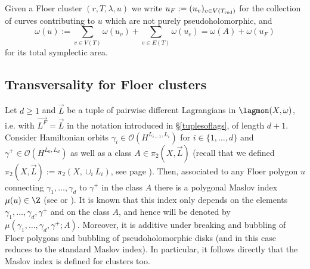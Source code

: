 Given a Floer cluster $(r,T,\lambda,u)$ we write $u_F:=(u_v)_{v\in V(T_\textnormal{red})}$ for the collection of curves contributing to $u$ which are not purely pseudoholomorphic, and $$\omega(u):=\sum_{v\in V(T)}\omega(u_v)+\sum_{e\in E(T)}\omega(u_e)= \omega(A)+\omega(u_F)$$ for its total symplectic area.\label{uf}


\subsection{Transversality for Floer clusters}\label{transversality for floer clusters} %

Let $d\geq 1$ and $\vec{L}$ be a tuple of pairwise different Lagrangians in $\lagmon(X,\omega)$, i.e. with $\vec{L^F}=\vec{L}$ in the notation introduced in \S \ref{tuplesoflags}, of length $d+1$. Consider Hamiltonian orbits $\gamma_i\in \mathcal{O}(H^{L_{i-1},L_i})$ for $i\in \{1,\ldots, d\}$ and $\gamma^+\in \mathcal{O}(H^{L_0,L_d})$ as well as a class $A\in \pi_2(X,\vec{L})$ (recall that we defined $\pi_2(X,\vec{L}):=\pi_2(X,\cup_iL_i)$, see page \pageref{piconvention}). Then, associated to any Floer polygon $u$ connecting $\gamma_1,\ldots, \gamma_d$ to $\gamma^+$ in the class $A$ there is a polygonal Maslov index $\mu(u)\in \Z$ (see \cite{FO3:book-vol1} or \cite[Chapter 13]{Oh2015SymplecticHomology}). It is known that this index only depends on the elements $\gamma_1,\ldots, \gamma_d,\gamma^+$ and on the class $A$, and hence will be denoted by $\mu(\gamma_1,\ldots, \gamma_d,\gamma^+;A)$. Moreover, it is additive under breaking and bubbling of Floer polygons and bubbling of pseudoholomorphic disks (and in this case reduces to the standard Maslov index). In particular, it follows directly that the Maslov index is defined for clusters too.

